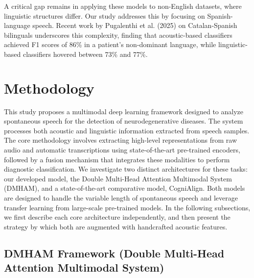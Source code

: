 \documentclass{Odyssey2026}
\begin{document}
A critical gap remains in applying these models to non-English datasets, where linguistic structures differ. Our study addresses this by focusing on Spanish-language speech. Recent work by Pugalenthi et al. (2025) on Catalan-Spanish bilinguals underscores this complexity, finding that acoustic-based classifiers achieved F1 scores of 86\% in a patient's non-dominant language, while linguistic-based classifiers hovered between 73\% and 77\%. 
\section{Methodology}

This study proposes a multimodal deep learning framework designed to analyze spontaneous speech for the detection of neurodegenerative diseases. The system processes both acoustic and linguistic information extracted from speech samples. The core methodology involves extracting high-level representations from raw audio and automatic transcriptions using state-of-the-art pre-trained encoders, followed by a fusion mechanism that integrates these modalities to perform diagnostic classification. We investigate two distinct architectures for these tasks: our developed model, the Double Multi-Head Attention Multimodal System (DMHAM), and a state-of-the-art comparative model, CogniAlign. Both models are designed to handle the variable length of spontaneous speech and leverage transfer learning from large-scale pre-trained models. In the following subsections, we first describe each core architecture independently, and then present the strategy by which both are augmented with handcrafted acoustic features.

\subsection{DMHAM Framework (Double Multi-Head Attention Multimodal System)}
\end{document}
